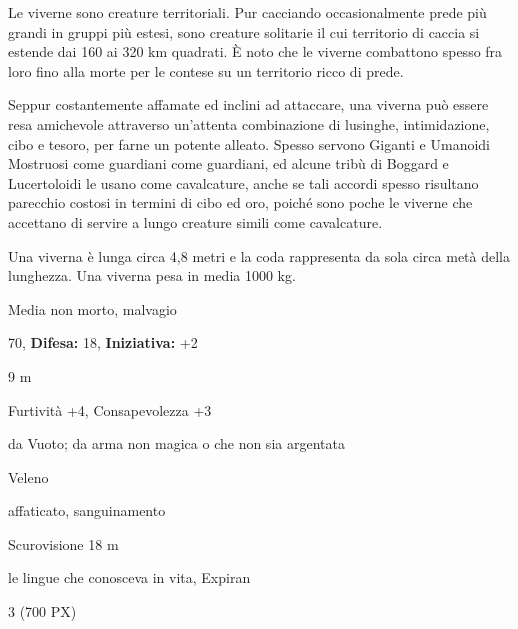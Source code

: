 \begin{multicols}{2}
{Le viverne sono creature territoriali. Pur cacciando occasionalmente prede più grandi in gruppi più estesi, sono creature solitarie il cui territorio di caccia si estende dai 160 ai 320 km quadrati. È noto che le viverne combattono spesso fra loro fino alla morte per le contese su un territorio ricco di prede.

Seppur costantemente affamate ed inclini ad attaccare, una viverna può essere resa amichevole attraverso un'attenta combinazione di lusinghe, intimidazione, cibo e tesoro, per farne un potente alleato. Spesso servono Giganti e Umanoidi Mostruosi come guardiani come guardiani, ed alcune tribù di Boggard e Lucertoloidi le usano come cavalcature, anche se tali accordi spesso risultano parecchio costosi in termini di cibo ed oro, poiché sono poche le viverne che accettano di servire a lungo creature simili come cavalcature.

Una viverna è lunga circa 4,8 metri e la coda rappresenta da sola circa metà della lunghezza. Una viverna pesa in media 1000 kg.


\noindent
\begin{description}[noitemsep, topsep=0pt, parsep=0pt, partopsep=0pt, leftmargin=0cm, labelwidth=2.2cm]
	\item[\textbf{Taglia/Tipo:}] Media non morto, malvagio
	\item[\textbf{Caratt.:}] 
	\item[\textbf{Punti Ferita:}] 70,  \textbf{Difesa:} 18,  \textbf{Iniziativa:} +2
	\item[\textbf{Movimento:}] 9 m
	\item[\textbf{Tiri Salvez.:}] 
	\item[\textbf{Comp.:}] Furtività +4, Consapevolezza +3
	\item[\textbf{Res. Danni:}] da Vuoto; da arma non magica o che non sia argentata
	\item[\textbf{Imm. Danni:}] Veleno
	\item[\textbf{Immunità:}] affaticato, sanguinamento
	\item[\textbf{Sensi:}] Scurovisione 18 m
	\item[\textbf{Linguaggi:}] le lingue che conosceva in vita, Expiran
	\item[\textbf{Sfida:}] 3 (700 PX)\smallskip
\end{description}

}
\end{multicols}
